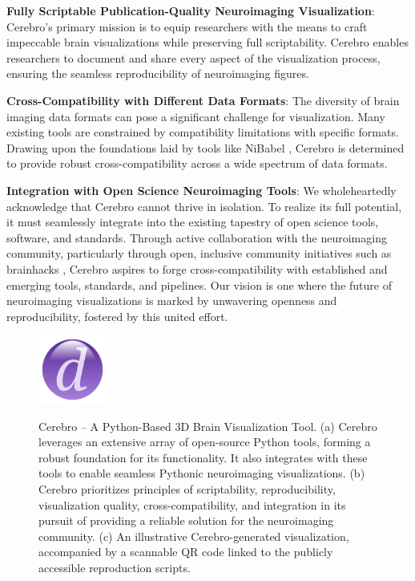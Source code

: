 \documentclass{article}
\begin{document}
\textbf{Fully Scriptable Publication-Quality Neuroimaging Visualization}:
Cerebro's primary mission is to equip researchers with the means to craft impeccable brain visualizations while preserving full scriptability. Cerebro enables researchers to document and share every aspect of the visualization process, ensuring the seamless reproducibility of neuroimaging figures.

\textbf{Cross-Compatibility with Different Data Formats}:
The diversity of brain imaging data formats can pose a significant challenge for visualization. Many existing tools are constrained by compatibility limitations with specific formats. Drawing upon the foundations laid by tools like NiBabel \cite{Brett2020-nx}, Cerebro is determined to provide robust cross-compatibility across a wide spectrum of data formats.

\textbf{Integration with Open Science Neuroimaging Tools}:
We wholeheartedly acknowledge that Cerebro cannot thrive in isolation. To realize its full potential, it must seamlessly integrate into the existing tapestry of open science tools, software, and standards. Through active collaboration with the neuroimaging community, particularly through open, inclusive community initiatives such as brainhacks \cite{gau2021brainhack}, Cerebro aspires to forge cross-compatibility with established and emerging tools, standards, and pipelines. Our vision is one where the future of neuroimaging visualizations is marked by unwavering openness and reproducibility, fostered by this united effort.

\begin{figure}[h]
    \centering
    \includegraphics[width=0.2\textwidth]{images/placeholder.png}
    \label{fig:cerebro}
    \caption{
        Cerebro – A Python-Based 3D Brain Visualization Tool. (a) Cerebro leverages an extensive array of open-source Python tools, forming a robust foundation for its functionality. It also integrates with these tools to enable seamless Pythonic neuroimaging visualizations. (b) Cerebro prioritizes principles of scriptability, reproducibility, visualization quality, cross-compatibility, and integration in its pursuit of providing a reliable solution for the neuroimaging community. (c) An illustrative Cerebro-generated visualization, accompanied by a scannable QR code linked to the publicly accessible reproduction scripts.
    }
\end{figure}
\end{document}
